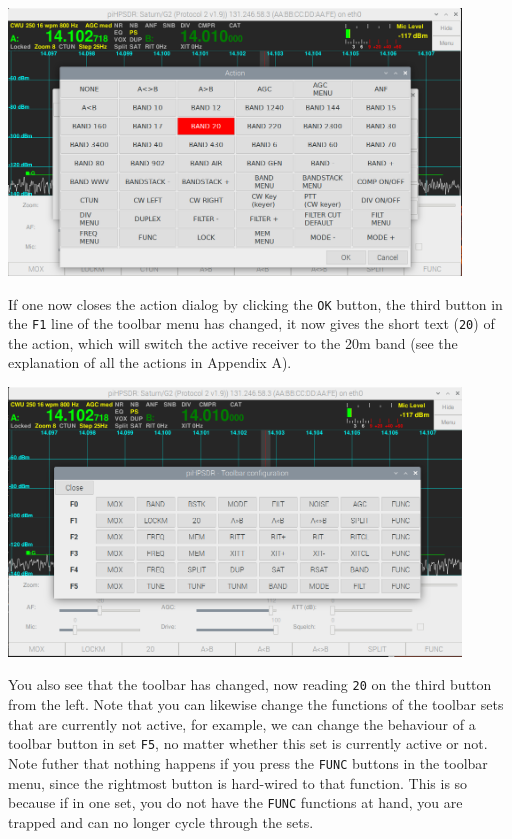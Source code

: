 \documentclass[12pt]{book}
\begin{document}
\begin{center}
\includegraphics[width=12cm]{ToolbarMenu3.png}
\end{center}

If one now closes the action dialog by clicking the \texttt{OK} button, the third button in the \texttt{F1}
line of the toolbar menu has changed, it now gives the short text (\texttt{20}) of the action, which will
switch the active receiver to the 20m band (see the explanation of all the actions in Appendix A).

\begin{center}
\includegraphics[width=12cm]{ToolbarMenu4.png}
\end{center}
You also see that the toolbar has changed, now reading \texttt{20} on the third button from the left. Note that
you can likewise change the functions of the toolbar sets that are currently not active, for example, we can
change the behaviour of a toolbar button in set \texttt{F5}, no matter whether this set is currently active
or not. Note futher that nothing happens if you press the \texttt{FUNC} buttons in the toolbar menu, since the
rightmost button is hard-wired to that function. This is so because if in one set, you do not have the 
\texttt{FUNC} functions at hand, you are trapped and can no longer cycle through the sets.
\end{document}
